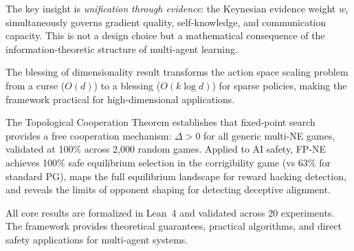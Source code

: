 \documentclass[11pt,a4paper]{article}
\begin{document}
The key insight is \emph{unification through evidence}: the Keynesian
evidence weight $w_i$ simultaneously governs gradient quality,
self-knowledge, and communication capacity. This is not a design
choice but a mathematical consequence of the information-theoretic
structure of multi-agent learning.

The blessing of dimensionality result transforms the action space
scaling problem from a curse ($O(d)$) to a blessing ($O(k \log d)$)
for sparse policies, making the framework practical for
high-dimensional applications.

The Topological Cooperation Theorem establishes that fixed-point search
provides a free cooperation mechanism: $\Delta > 0$ for all generic
multi-NE games, validated at 100\% across 2,000 random games. Applied
to AI safety, FP-NE achieves 100\% safe equilibrium selection in the
corrigibility game (vs 63\% for standard PG), maps the full equilibrium
landscape for reward hacking detection, and reveals the limits of
opponent shaping for detecting deceptive alignment.

All core results are formalized in Lean~4 and validated across 20
experiments. The framework provides theoretical guarantees, practical
algorithms, and direct safety applications for multi-agent systems.


\end{document}
